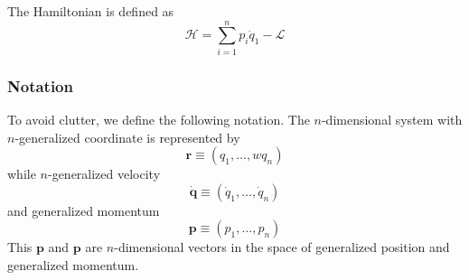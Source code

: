 \documentclass[../../../main.tex]{subfiles}
\begin{document}
The Hamiltonian is defined as 
\begin{equation*}
    \mathcal{H}=\sum_{i=1}^{n}p_i\dot{q}_1-\mathcal{L}
\end{equation*}

\subsubsection*{Notation}
To avoid clutter, we define the following notation.
The $n$-dimensional system with $n$-generalized coordinate is represented by 
\begin{equation*}
    \mathbf{r}\equiv(q_1,\dots,wq_n)
\end{equation*}
while $n$-generalized velocity
\begin{equation*}
    \dot{\mathbf{q}}\equiv(\dot{q}_1,\dots,\dot{q}_n)
\end{equation*}
and generalized momentum
\begin{equation*}
    \mathbf{p}\equiv(p_1,\dots,p_n)
\end{equation*}
This $\mathbf{p}$ and $\mathbf{p}$ are $n$-dimensional vectors in the space of generalized position and generalized momentum.
\end{document}
